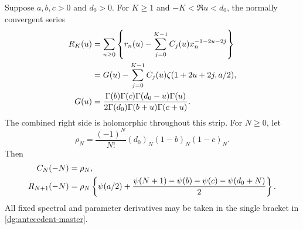 \begin{lemma}
\label{dg:antecedent}
Suppose $a,b,c>0$ and $d_0>0$. For $K\geq1$ and
$-K<\Re u<d_0$, the normally convergent series
\begin{align}
 R_K(u)&=\sum_{n\geq0}\left\{r_n(u)-
       \sum_{j=0}^{K-1}C_j(u)x_n^{-1-2u-2j}\right\}\notag\\
 &=G(u)-\sum_{j=0}^{K-1}C_j(u)\zeta(1+2u+2j,a/2),\notag\\
 G(u)&=\frac{\Gamma(b)\Gamma(c)\Gamma(d_0-u)\Gamma(u)}
          {2\Gamma(d_0)\Gamma(b+u)\Gamma(c+u)}.
 \label{dg:antecedent-master}
\end{align}
The combined right side is holomorphic throughout this strip.
For $N\geq0$, let
\[
 \rho_N=\frac{(-1)^N}{N!}(d_0)_N(1-b)_N(1-c)_N.
\]
Then
\begin{align}
 C_N(-N)&=\rho_N,\notag\\
 R_{N+1}(-N)&=\rho_N\left\{\psi(a/2)+
 \frac{\psi(N+1)-\psi(b)-\psi(c)-\psi(d_0+N)}2\right\}.
 \label{dg:antecedent-closed}
\end{align}
All fixed spectral and parameter derivatives may be taken in the
single bracket in \eqref{dg:antecedent-master}.
\end{lemma}
